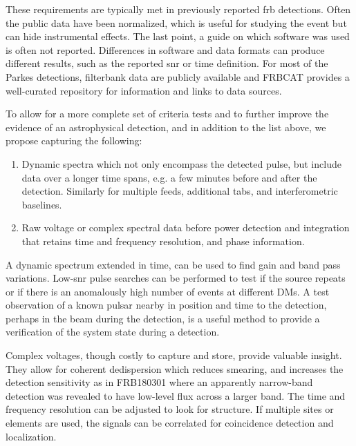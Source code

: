 \documentclass[a4paper,fleqn,usenatbib]{mnras}
\begin{document}
These requirements are typically met in previously reported \gls{frb}
detections. Often the public data have been normalized, which is useful for
studying the event but can hide instrumental effects.  The last point, a guide
on which software was used is often not reported.  Differences in software and
data formats can produce different results, such as the reported \gls{snr} or
time definition. For most of the Parkes detections, filterbank data are publicly
available and FRBCAT \citep{2016PASA...33...45P} provides a well-curated
repository for information and links to data sources.

To allow for a more complete set of criteria tests and to further improve the
evidence of an astrophysical detection, and in addition to the list above, we
propose capturing the following:

\begin{enumerate}
    \item Dynamic spectra which not only encompass the detected pulse, but
    include data over a longer time spans, e.g. a few minutes before and after
    the detection. Similarly for multiple feeds, additional \glspl{tab}, and
    interferometric baselines.
    \item Raw voltage or complex spectral data before power detection and
    integration that retains time and frequency resolution, and phase
    information.
\end{enumerate}

A dynamic spectrum extended in time, can be used to find gain and band pass
variations. Low-\gls{snr} pulse searches can be performed to test if the source
repeats or if there is an anomalously high number of events at different DMs.  A
test observation of a known pulsar nearby in position and time to the detection,
perhaps in the beam during the detection, is a useful method to provide a
verification of the system state during a detection.

Complex voltages, though costly to capture and store, provide valuable insight.
They allow for coherent dedispersion which reduces smearing, and increases the
detection sensitivity as in FRB180301 \citep{atel11376} where an apparently
narrow-band detection was revealed to have low-level flux across a larger band.
The time and frequency resolution can be adjusted to look for structure. If
multiple sites or elements are used, the signals can be correlated for
coincidence detection and localization.

\end{document}
